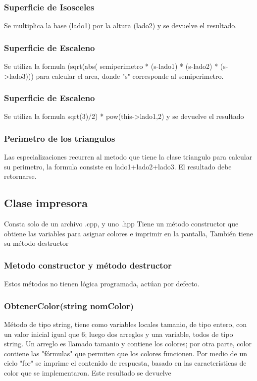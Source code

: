 \documentclass[11pt]{article}
\begin{document}
\begin{itemize}
\subsubsection{Superficie de Isosceles}
	Se multiplica la base (lado1) por la altura (lado2) y se devuelve el resultado.

\subsubsection{Superficie de Escaleno}
	  Se utiliza la formula (sqrt(abs( semiperimetro * (s-lado1) * (s-lado2) * (s->lado3))) para calcular el area, donde "s" corresponde al semiperimetro.

\subsubsection{Superficie de Escaleno}
	Se utiliza la formula sqrt(3)/2) * pow(this->lado1,2) y se devuelve el resultado

\subsubsection{Perimetro de los triangulos}
	Las especializaciones recurren al metodo que tiene la clase triangulo para calcular su perimetro, la formula consiste en lado1+lado2+lado3. El resultado debe retornarse.

\subsection{Clase impresora}
	Consta solo de un archivo .cpp, y uno .hpp Tiene un método constructor que obtiene las variables para asignar colores e imprimir en la pantalla, También tiene su método destructor

\subsubsection{Metodo constructor y método destructor}
	Estos métodos no tienen lógica programada, actúan por defecto.

\subsubsection{ObtenerColor(string nomColor)}
	Método de tipo string, tiene como variables locales tamanio, de tipo entero, con un valor inicial igual que 6; luego dos arreglos y una variable, todos de tipo string. Un arreglo es llamado tamanio y contiene los colores; por otra parte, color contiene las "fórmulas" que permiten que los colores funcionen.
	Por medio de un ciclo "for" se imprime el contenido de respuesta, basado en las características de color que se implementaron. Este resultado se devuelve


\end{itemize}
\end{document}
